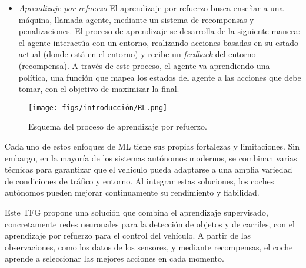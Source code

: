 \begin{itemize}
    \item \textit{Aprendizaje por refuerzo}  \cite{imitation-learning} El aprendizaje por refuerzo busca enseñar a una máquina, llamada agente, mediante un sistema de recompensas y penalizaciones. El proceso de aprendizaje se desarrolla de la siguiente manera: el agente interactúa con un entorno, realizando acciones basadas en su estado actual (donde está en el entorno) y recibe un \textit{feedback} del entorno (recompensa). A través de este proceso, el agente va aprendiendo una política, una función que mapea los estados del agente a las acciones que debe tomar, con el objetivo de maximizar la final.

\end{itemize}

\begin{figure}[ht]
  \begin{center}
    \texttt{[image: figs/introducción/RL.png]}
  \end{center}
  \caption{Esquema del proceso de aprendizaje por refuerzo.}
  \label{rl}
\end{figure}

Cada uno de estos enfoques de \ac{ML} tiene sus propias fortalezas y limitaciones. Sin embargo, en la mayoría de los sistemas autónomos modernos, se combinan varias técnicas para garantizar que el vehículo pueda adaptarse a una amplia variedad de condiciones de tráfico y entorno. Al integrar estas soluciones, los coches autónomos pueden mejorar continuamente su rendimiento y fiabilidad.

Este \ac{TFG} propone una solución que combina el aprendizaje supervisado, concretamente redes neuronales para la detección de objetos y de carriles, con el aprendizaje por refuerzo para el control del vehículo. A partir de las observaciones, como los datos de los sensores, y mediante recompensas, el coche aprende a seleccionar las mejores acciones en cada momento.
